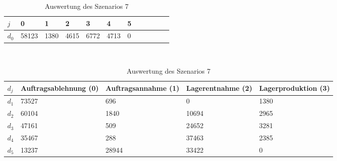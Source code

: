 \begin{table}[h!]
\renewcommand{\arraystretch}{1.5}
  \begin{center}
    \caption{Auswertung des Szenarios 7}  \label{AS7}
    \vspace*{3mm}
    \begin{tabular}{l l l l l l l l l l l l }  \hline 
         $j$ & 0 & 1  & 2 & 3 & 4  & 5   \\  \hline
$d_{0}$ &  58123 &  1380 &  4615 &  6772 &  4713 &  0 \\
\hline
    \end{tabular} \\[3mm]
        \begin{tabular}{ l p{2.5cm} p{2.5cm} p{2.5cm} p{2.5cm} }   \hline    %
    $d_j$ & Auftrags\-ablehnung (0) & Auftrags\-annahme (1)  & Lager\-entnahme (2) & Lager\-produktion (3)\\\hline 
$d_1$ &  73527 &    696 &    0 &  1380 \\
$d_2$ &  60104 &   1840 &  10694 &  2965 \\
$d_3$ &  47161 &    509 &  24652 &  3281 \\
$d_4$ &  35467 &    288 &  37463 &  2385 \\
$d_5$ &  13237 &  28944 &  33422 &   0 \\
          \hline
   \end{tabular} \\[3mm]
     \end{center}
\end{table}



